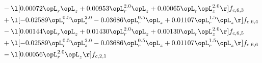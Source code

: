 \begin{alignat}{2}
& - \l[  0.00072 \opL_r \opL_z +  0.00953 \opL_r^{2.0} \opL_z +  0.00065 \opL_r \opL_z^{2.0}  \r] f_{c,6,3} \nonumber \\ 
& + \l[  -0.02589 \opL_r^{0.5} \opL_z^{2.0}   -0.03686 \opL_r^{0.5} \opL_z +  0.01107 \opL_r^{1.5} \opL_z  \r] f_{c,6,4} \nonumber \\ 
& - \l[  0.00144 \opL_r \opL_z +  0.01430 \opL_r^{2.0} \opL_z +  0.00130 \opL_r \opL_z^{2.0}  \r] f_{c,6,5} \nonumber \\ 
& + \l[  -0.02589 \opL_r^{0.5} \opL_z^{2.0}   -0.03686 \opL_r^{0.5} \opL_z +  0.01107 \opL_r^{1.5} \opL_z  \r] f_{c,6,6} \nonumber \\ 
& - \l[  0.00056 \opL_r^{2.0} \opL_z  \r] f_{c,2,1} \nonumber \\ 
\end{alignat} 


